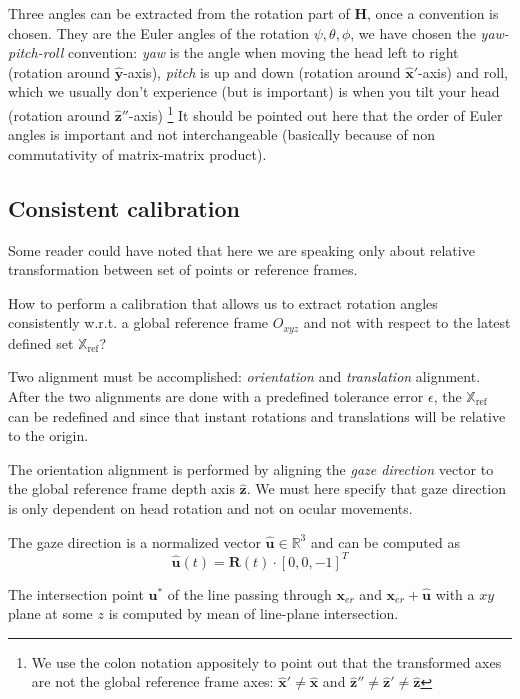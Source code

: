 \documentclass[acmtocl,acmnow]{acmtrans2m}
\begin{document}
Three angles can be extracted from the rotation part of $\mathbf{H}$, once a
convention is chosen.
They are the Euler angles of the rotation $\psi, \theta, \phi$, we have chosen
the \emph{yaw-pitch-roll} convention: 
\emph{yaw} is the angle when moving the head left to right (rotation around
$\mathbf{\hat{y}}$-axis), \emph{pitch} is up and down (rotation around
$\mathbf{\hat{x}}'$-axis) and
roll, which we usually don't experience (but is important) is when you tilt your head (rotation
around $\mathbf{\hat{z}}''$-axis)
\footnote{We use the colon notation appositely to point out that the transformed axes are not the global reference frame axes: $\mathbf{\hat{x}}' \neq \mathbf{\hat{x}}$ and  $\mathbf{\hat{z}}'' \neq \mathbf{\hat{z}}'  \neq \mathbf{\hat{z}}$ }
It should be pointed out here that the
order of Euler angles is important and not 
interchangeable (basically because of non commutativity of matrix-matrix
product).

\subsection{Consistent calibration}\label{sec:consistentcalibration}
Some reader could have noted that here we are speaking only about relative
transformation between set of points or reference frames.

How to perform a calibration that allows us to extract rotation angles
consistently w.r.t. a global
reference frame $O_{xyz}$ and not with respect to the  latest defined  set $\mathbb{X}_{\textrm{ref}}$?

Two alignment must be accomplished: \emph{orientation} and \emph{translation} alignment.
After the two alignments are done with a predefined tolerance error $\epsilon$, the $\mathbb{X}_{\textrm{ref}}$ can be redefined and since that instant rotations and translations will be 
relative to the origin.

The orientation alignment is  performed by aligning the \emph{gaze direction} vector to the global
reference frame depth axis $\mathbf{\hat{z}}$. We must here specify that gaze direction is only dependent on head rotation and not on ocular movements.

The gaze direction is a normalized vector $\mathbf{\hat{u}} \in \mathbb{R}^3$ and can be computed
as
\begin{equation}\label{eq:gazedirection}
 \mathbf{\hat{u}}(t) = \mathbf{R}(t) \cdot [ 0,0,-1]^T
\end{equation}

The intersection point $\mathbf{u}^{*}$ of the line passing through $\mathbf{x}_{er}$ and $\mathbf{x}_{er}+\hat{\mathbf{u}}$ with a $xy$ plane at some $z$ is computed by mean of line-plane intersection.
\end{document}
